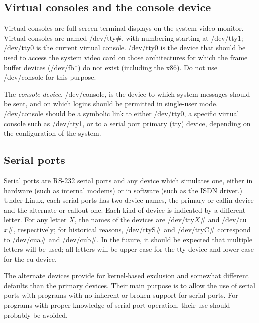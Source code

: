 \subsection{Virtual consoles and the console device}

Virtual consoles are full-screen terminal displays on the system video
monitor.  Virtual consoles are named {\file /dev/tty$\#$}, with
numbering starting at {\file /dev/tty1}; {\file /dev/tty0} is the
current virtual console.  {\file /dev/tty0} is the device that should
be used to access the system video card on those architectures for
which the frame buffer devices ({\file /dev/fb*}) do not exist
(including the x86).  Do not use {\file /dev/console} for this
purpose.

The {\em console device\/}, {\file /dev/console}, is the device to
which system messages should be sent, and on which logins should be
permitted in single-user mode.  {\file /dev/console} should be a
symbolic link to either {\file /dev/tty0}, a specific virtual console
such as {\file /dev/tty1}, or to a serial port primary ({\file tty})
device, depending on the configuration of the system.

\subsection{Serial ports}

Serial ports are RS-232 serial ports and any device which simulates
one, either in hardware (such as internal modems) or in software (such
as the ISDN driver.)  Under Linux, each serial ports has two device
names, the primary or callin device and the alternate or callout one.
Each kind of device is indicated by a different letter.  For any
letter $X$, the names of the devices are {\file /dev/tty${X\#}$} and
{\file /dev/cu${x\#}$}, respectively; for historical reasons, {\file
/dev/ttyS$\#$} and {\file /dev/ttyC$\#$} correspond to {\file
/dev/cua$\#$} and {\file /dev/cub$\#$}.  In the future, it should be
expected that multiple letters will be used; all letters will be upper
case for the {\file tty} device and lower case for the {\file cu}
device.

The alternate devices provide for kernel-based exclusion and somewhat
different defaults than the primary devices.  Their main purpose is to
allow the use of serial ports with programs with no inherent or broken
support for serial ports.  For programs with proper knowledge of
serial port operation, their use should probably be avoided.

